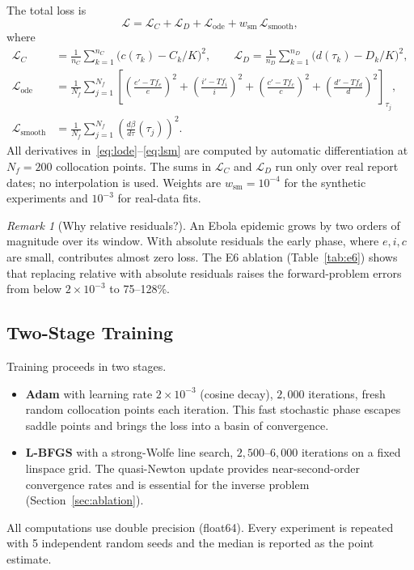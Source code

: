 \documentclass[11pt,a4paper]{article}
\theoremstyle{remark}
\newtheorem*{remark}{Remark}
\begin{document}
The total loss is
\begin{equation}
    \mathcal{L} = \mathcal{L}_C + \mathcal{L}_D + \mathcal{L}_{\text{ode}} +
                  w_{\text{sm}}\,\mathcal{L}_{\text{smooth}},
    \label{eq:loss}
\end{equation}
where
\begin{align}
    \mathcal{L}_C &= \frac{1}{n_C}\sum_{k=1}^{n_C}\bigl(c(\tau_k) - C_k/K\bigr)^2,
    \qquad
    \mathcal{L}_D = \frac{1}{n_D}\sum_{k=1}^{n_D}\bigl(d(\tau_k) - D_k/K\bigr)^2,
    \label{eq:ldata}\\
    \mathcal{L}_{\text{ode}} &= \frac{1}{N_f}\sum_{j=1}^{N_f}
        \left[\left(\frac{e' - Tf_e}{e}\right)^{\!2}
             +\left(\frac{i' - Tf_i}{i}\right)^{\!2}
             +\left(\frac{c' - Tf_c}{c}\right)^{\!2}
             +\left(\frac{d' - Tf_d}{d}\right)^{\!2}\right]_{\!\tau_j},
    \label{eq:lode}\\
    \mathcal{L}_{\text{smooth}} &= \frac{1}{N_f}\sum_{j=1}^{N_f}
        \left(\frac{d\beta}{d\tau}(\tau_j)\right)^{\!2}.
    \label{eq:lsm}
\end{align}
All derivatives in~\eqref{eq:lode}--\eqref{eq:lsm} are computed by automatic
differentiation at $N_f = 200$ collocation points.  The sums in
$\mathcal{L}_C$ and $\mathcal{L}_D$ run only over real report dates; no
interpolation is used.  Weights are $w_{\text{sm}} = 10^{-4}$ for the
synthetic experiments and $10^{-3}$ for real-data fits.

\begin{remark}[Why relative residuals?]
An Ebola epidemic grows by two orders of magnitude over its window.  With
absolute residuals the early phase, where $e,i,c$ are small, contributes
almost zero loss.  The E6 ablation (Table~\ref{tab:e6}) shows that replacing
relative with absolute residuals raises the forward-problem errors from
below $2\times10^{-3}$ to 75--128\%.
\end{remark}

\subsection{Two-Stage Training}

Training proceeds in two stages.
\begin{itemize}
    \item \textbf{Adam} \cite{kingma2015adam} with learning rate $2\times10^{-3}$
          (cosine decay), $2{,}000$ iterations, fresh random collocation points
          each iteration.  This fast stochastic phase escapes saddle points and
          brings the loss into a basin of convergence.
    \item \textbf{L-BFGS} \cite{liu1989limited} with a strong-Wolfe line search,
          $2{,}500$--$6{,}000$ iterations on a fixed linspace grid.  The
          quasi-Newton update provides near-second-order convergence rates and is
          essential for the inverse problem (Section~\ref{sec:ablation}).
\end{itemize}
All computations use double precision (float64).  Every experiment is repeated
with 5 independent random seeds and the median is reported as the point
estimate.
\end{document}
